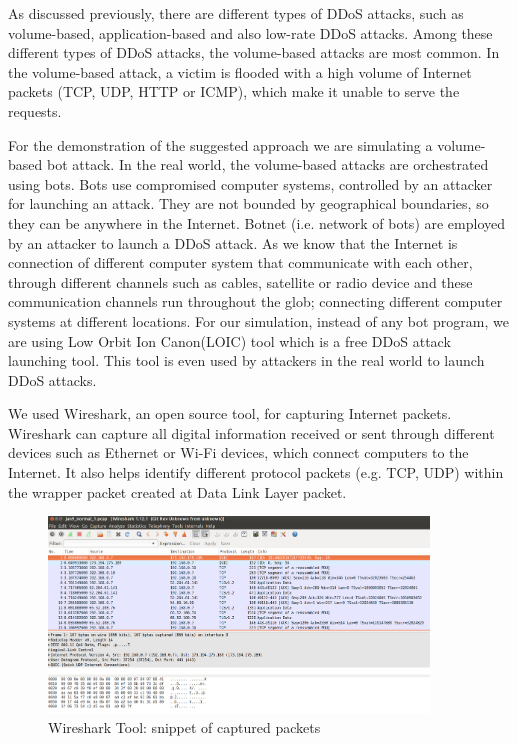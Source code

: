 \documentclass[12pt,oneside,a4paper]{article}
\begin{document}
As discussed previously, there are different types of DDoS attacks, such as volume-based, application-based and also low-rate DDoS attacks. Among these different types of DDoS attacks, the volume-based attacks are most common. In the volume-based attack, a victim is flooded with a high volume of Internet packets (TCP, UDP, HTTP or ICMP), which make it unable to serve the requests.

For the demonstration of the suggested approach we are simulating a volume-based bot attack. In the real world, the volume-based attacks are orchestrated using bots. Bots use compromised computer systems, controlled by an attacker for launching an attack. They are not bounded by geographical boundaries, so they can be anywhere in the Internet. Botnet (i.e. network of bots) are employed by an attacker to launch a DDoS attack. As we know that the Internet is connection of different computer system that communicate with each other, through different channels such as cables, satellite or radio device and these communication channels run throughout the glob; connecting different computer systems at different locations. For our simulation, instead of any bot program, we are using Low Orbit Ion Canon(LOIC) tool which is a free DDoS attack launching tool. This tool is even used by attackers in the real world to launch DDoS attacks.

We used Wireshark, an open source tool, for capturing Internet packets. Wireshark can capture all digital information received or sent through different devices such as Ethernet or Wi-Fi devices, which connect computers to the Internet. It also helps identify different protocol packets (e.g. TCP, UDP) within the wrapper packet created at Data Link Layer packet.\par

\begin{figure}[H]
\centering
\includegraphics[width=0.90\textwidth]{Wireshark_Tools.png}
\caption{Wireshark Tool: snippet of captured packets} \label{fig:wireshark}
\end{figure}
\end{document}
